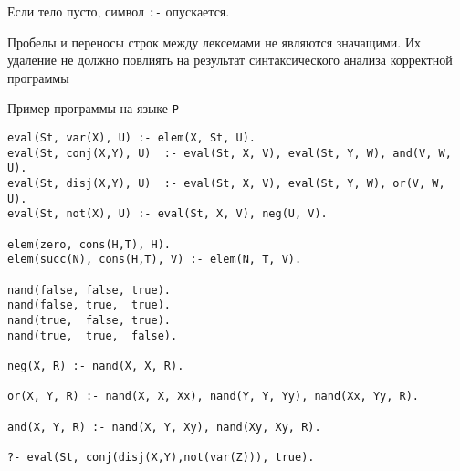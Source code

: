 \documentclass[12pt]{article}
\begin{document}
Если тело пусто, символ \verb!:-! опускается. 

Пробелы и переносы строк между лексемами не являются значащими. Их удаление не должно повлиять на результат синтаксического анализа корректной программы

\begin{center}
    \Large{Пример программы на языке \verb!P!}
\end{center}

\begin{verbatim}
eval(St, var(X), U) :- elem(X, St, U).
eval(St, conj(X,Y), U)  :- eval(St, X, V), eval(St, Y, W), and(V, W, U).
eval(St, disj(X,Y), U)  :- eval(St, X, V), eval(St, Y, W), or(V, W, U).
eval(St, not(X), U) :- eval(St, X, V), neg(U, V).

elem(zero, cons(H,T), H).
elem(succ(N), cons(H,T), V) :- elem(N, T, V).

nand(false, false, true).
nand(false, true,  true).
nand(true,  false, true).
nand(true,  true,  false).

neg(X, R) :- nand(X, X, R).

or(X, Y, R) :- nand(X, X, Xx), nand(Y, Y, Yy), nand(Xx, Yy, R).

and(X, Y, R) :- nand(X, Y, Xy), nand(Xy, Xy, R).

?- eval(St, conj(disj(X,Y),not(var(Z))), true).
\end{verbatim}
\end{document}
